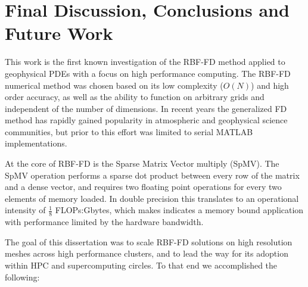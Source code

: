 \chapter{Final Discussion, Conclusions and Future Work}
\label{chap:conclusions}

This work is the first known investigation of the RBF-FD method applied to geophysical PDEs with a focus on high performance computing. The RBF-FD numerical method was chosen based on its low complexity ($O(N)$) and high order accuracy, as well as the ability to function on arbitrary grids and independent of the number of dimensions. In recent years the generalized FD method has rapidly gained popularity in atmospheric and geophysical science communities, but prior to this effort was limited to serial MATLAB implementations. 

At the core of RBF-FD is the Sparse Matrix Vector multiply (SpMV). The SpMV operation performs a sparse dot product between every row of the matrix and a dense vector, and requires two floating point operations for every two elements of memory loaded. In double precision this translates to an operational intensity of $\frac{1}{8}$ FLOPs:Gbytes, which makes indicates a memory bound application with performance limited by the hardware bandwidth. 

The goal of this dissertation was to scale RBF-FD solutions on high resolution meshes across high performance clusters, and to lead the way for its adoption within HPC and supercomputing circles. To that end we accomplished the following: 

